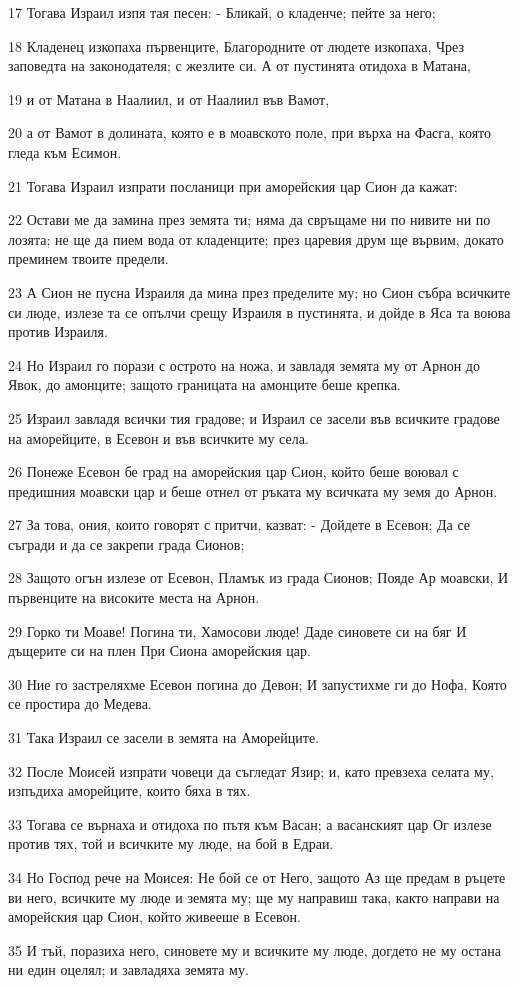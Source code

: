 \par 17 Тогава Израил изпя тая песен: - Бликай, о кладенче; пейте за него;
\par 18 Кладенец изкопаха първенците, Благородните от людете изкопаха, Чрез заповедта на законодателя; с жезлите си. А от пустинята отидоха в Матана,
\par 19 и от Матана в Наалиил, и от Наалиил във Вамот,
\par 20 а от Вамот в долината, която е в моавското поле, при върха на Фасга, която гледа към Есимон.
\par 21 Тогава Израил изпрати посланици при аморейския цар Сион да кажат:
\par 22 Остави ме да замина през земята ти; няма да свръщаме ни по нивите ни по лозята; не ще да пием вода от кладенците; през царевия друм ще вървим, докато преминем твоите предели.
\par 23 А Сион не пусна Израиля да мина през пределите му; но Сион събра всичките си люде, излезе та се опълчи срещу Израиля в пустинята, и дойде в Яса та воюва против Израиля.
\par 24 Но Израил го порази с острото на ножа, и завладя земята му от Арнон до Явок, до амонците; защото границата на амонците беше крепка.
\par 25 Израил завладя всички тия градове; и Израил се засели във всичките градове на аморейците, в Есевон и във всичките му села.
\par 26 Понеже Есевон бе град на аморейския цар Сион, който беше воювал с предишния моавски цар и беше отнел от ръката му всичката му земя до Арнон.
\par 27 За това, ония, които говорят с притчи, казват: - Дойдете в Есевон; Да се съгради и да се закрепи града Сионов;
\par 28 Защото огън излезе от Есевон, Пламък из града Сионов; Пояде Ар моавски, И първенците на високите места на Арнон.
\par 29 Горко ти Моаве! Погина ти, Хамосови люде! Даде синовете си на бяг И дъщерите си на плен При Сиона аморейския цар.
\par 30 Ние го застреляхме Есевон погина до Девон; И запустихме ги до Нофа, Която се простира до Медева.
\par 31 Така Израил се засели в земята на Аморейците.
\par 32 После Моисей изпрати човеци да съгледат Язир; и, като превзеха селата му, изпъдиха аморейците, които бяха в тях.
\par 33 Тогава се върнаха и отидоха по пътя към Васан; а васанският цар Ог излезе против тях, той и всичките му люде, на бой в Едраи.
\par 34 Но Господ рече на Моисея: Не бой се от Него, защото Аз ще предам в ръцете ви него, всичките му люде и земята му; ще му направиш така, както направи на аморейския цар Сион, който живееше в Есевон.
\par 35 И тъй, поразиха него, синовете му и всичките му люде, догдето не му остана ни един оцелял; и завладяха земята му.

